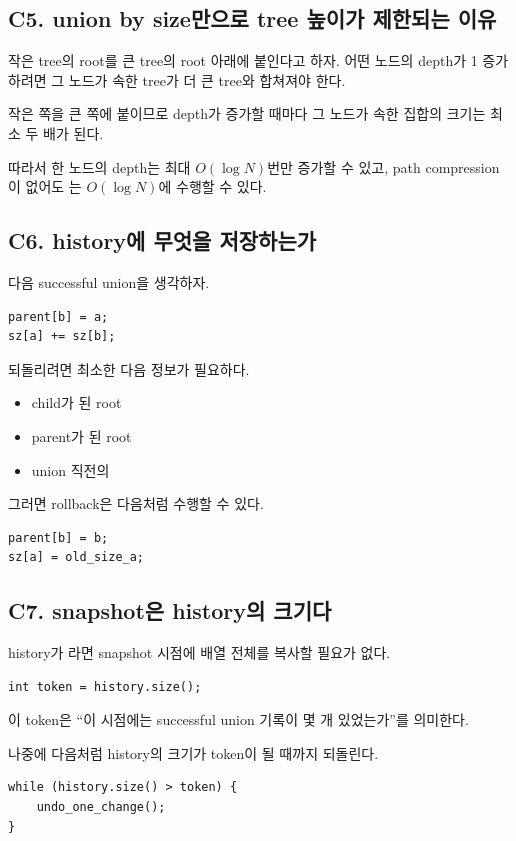 \subsection{C5. union by size만으로 tree 높이가 제한되는 이유}
작은 tree의 root를 큰 tree의 root 아래에 붙인다고 하자. 어떤 노드의 depth가 1 증가하려면 그 노드가 속한 tree가 더 큰 tree와 합쳐져야 한다.

작은 쪽을 큰 쪽에 붙이므로 depth가 증가할 때마다 그 노드가 속한 집합의 크기는 최소 두 배가 된다.

따라서 한 노드의 depth는 최대 $O(\log N)$번만 증가할 수 있고, path compression이 없어도 는 $O(\log N)$에 수행할 수 있다.

\subsection{C6. history에 무엇을 저장하는가}
다음 successful union을 생각하자.
\begin{lstlisting}
parent[b] = a;
sz[a] += sz[b];
\end{lstlisting}

되돌리려면 최소한 다음 정보가 필요하다.
\begin{itemize}
\item child가 된 root 
\item parent가 된 root 
\item union 직전의 
\end{itemize}

그러면 rollback은 다음처럼 수행할 수 있다.
\begin{lstlisting}
parent[b] = b;
sz[a] = old_size_a;
\end{lstlisting}

\subsection{C7. snapshot은 history의 크기다}
history가 라면 snapshot 시점에 배열 전체를 복사할 필요가 없다.

\begin{lstlisting}
int token = history.size();
\end{lstlisting}

이 token은 ``이 시점에는 successful union 기록이 몇 개 있었는가''를 의미한다.

나중에 다음처럼 history의 크기가 token이 될 때까지 되돌린다.
\begin{lstlisting}
while (history.size() > token) {
    undo_one_change();
}
\end{lstlisting}

